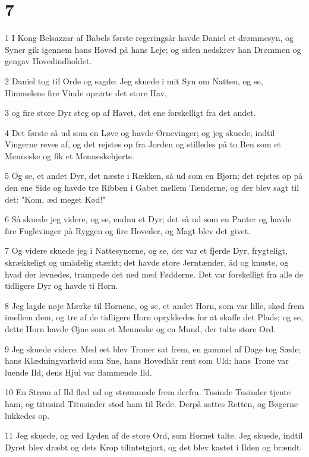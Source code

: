 \chapter{7}

\par 1 I Kong Belsazzar af Babels første regeringsår havde Daniel et drømmesyn, og Syner gik igennem hans Hoved på hans Leje; og siden nedskrev han Drømmen og gengav Hovedindholdet.
\par 2 Daniel tog til Orde og sagde: Jeg skuede i mit Syn om Natten, og se, Himmelens fire Vinde oprørte det store Hav,
\par 3 og fire store Dyr steg op af Havet, det ene forskelligt fra det andet.
\par 4 Det første så ud som en Løve og havde Ørnevinger; og jeg skuede, indtil Vingerne reves af, og det rejstes op fra Jorden og stilledes på to Ben som et Menneske og fik et Menneskehjerte.
\par 5 Og se, et andet Dyr, det næste i Rækken, så ud som en Bjørn; det rejstes op på den ene Side og havde tre Ribben i Gabet mellem Tænderne, og der blev sagt til det: "Kom, æd meget Kød!"
\par 6 Så skuede jeg videre, og se, endnu et Dyr; det så ud som en Panter og havde fire Fuglevinger på Ryggen og fire Hoveder, og Magt blev det givet.
\par 7 Og videre skuede jeg i Nattesynerne, og se, der var et fjerde Dyr, frygteligt, skrækkeligt og umådelig stærkt; det havde store Jerntænder, åd og knuste, og hvad der levnedes, trampede det ned med Fødderne. Det var forskelligt fra alle de tidligere Dyr og havde ti Horn.
\par 8 Jeg lagde nøje Mærke til Hornene, og se, et andet Horn, som var lille, skød frem imellem dem, og tre af de tidligere Horn oprykkedes for at skaffe det Plads; og se, dette Horn havde Øjne som et Menneske og en Mund, der talte store Ord.
\par 9 Jeg skuede videre: Med eet blev Troner sat frem, en gammel af Dage tog Sæde; hans Klædningvarhvid som Sne, hans Hovedhår rent som Uld; hans Trone var luende Ild, dens Hjul var flammende Ild.
\par 10 En Strøm af Ild flød ud og strømmede frem derfra. Tusinde Tusinder tjente ham, og titusind Titusinder stod ham til Rede. Derpå sattes Retten, og Bøgerne lukkedes op.
\par 11 Jeg skuede, og ved Lyden af de store Ord, som Hornet talte. Jeg skuede, indtil Dyret blev dræbt og dets Krop tilintetgjort, og det blev kastet i Ilden og brændt.
